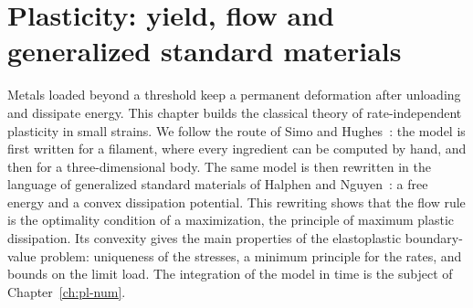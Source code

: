 \chapter{Plasticity: yield, flow and generalized standard materials}\label{ch:pl}

Metals loaded beyond a threshold keep a permanent deformation after unloading and dissipate energy. This chapter builds the classical theory of rate-independent plasticity in small strains. We follow the route of Simo and Hughes~\cite{SimoHughes1998}: the model is first written for a filament, where every ingredient can be computed by hand, and then for a three-dimensional body. The same model is then rewritten in the language of generalized standard materials of Halphen and Nguyen~\cite{HalphenNguyen1975}: a free energy and a convex dissipation potential. This rewriting shows that the flow rule is the optimality condition of a maximization, the principle of maximum plastic dissipation. Its convexity gives the main properties of the elastoplastic boundary-value problem: uniqueness of the stresses, a minimum principle for the rates, and bounds on the limit load. The integration of the model in time is the subject of Chapter~\ref{ch:pl-num}.

